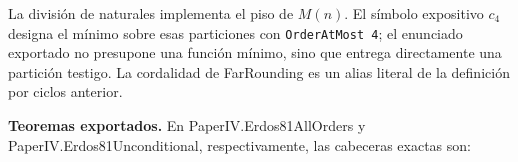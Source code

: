 \documentclass[spanish,11pt,a4paper]{article}
\begin{document}
La división de naturales implementa el piso de \(M(n)\). El símbolo expositivo \(c_4\) designa el mínimo sobre esas particiones con \mbox{\texttt{OrderAtMost\ 4}}; el enunciado exportado no presupone una función mínimo, sino que entrega directamente una partición testigo. La cordalidad de {\ttfamily\small FarRounding} es un alias literal de la definición por ciclos anterior.

\textbf{Teoremas exportados.} En {\ttfamily\small PaperIV.\discretionary{\hbox{\ensuremath{\hookrightarrow}}}{}{}Erdos81AllOr\discretionary{\hbox{\ensuremath{\hookrightarrow}}}{}{}ders} y {\ttfamily\small PaperIV.\discretionary{\hbox{\ensuremath{\hookrightarrow}}}{}{}Erdos81Uncon\discretionary{\hbox{\ensuremath{\hookrightarrow}}}{}{}ditional}, respectivamente, las cabeceras exactas son:

\end{document}

